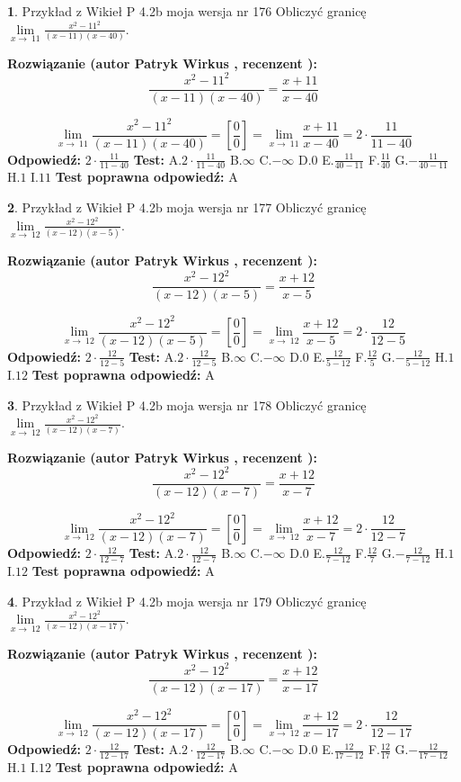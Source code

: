 \documentclass[12pt, a4paper]{article}
\theoremstyle{definition} %
\newtheorem{zad}{}
\newcommand{\zadStart}[1]{\begin{zad}#1\newline}
\newcommand{\zadStop}{\end{zad}}
\newcommand{\rozwStart}[2]{\noindent \textbf{Rozwiązanie (autor #1 , recenzent #2): }\newline}
\newcommand{\rozwStop}{\newline}
\newcommand{\odpStart}{\noindent \textbf{Odpowiedź:}\newline}
\newcommand{\odpStop}{\newline}
\newcommand{\testStart}{\noindent \textbf{Test:}\newline}
\newcommand{\testStop}{\newline}
\newcommand{\kluczStart}{\noindent \textbf{Test poprawna odpowiedź:}\newline}
\newcommand{\kluczStop}{\newline}
\begin{document}
\zadStart{Przykład z Wikieł P 4.2b moja wersja nr 176}
Obliczyć granicę $\lim\limits_{x\to\ 11}\frac{x^{2}-11^{2}}{(x-11)(x-40)}$.
\zadStop
\rozwStart{Patryk Wirkus}{}
$$\frac{x^{2}-11^{2}}{(x-11)(x-40)}=\frac{x+11}{x-40}$$

$$\lim\limits_{x\to\ 11}\frac{x^{2}-11^{2}}{(x-11)(x-40)}=[\frac{0}{0}]=\lim\limits_{x\to\ 11}\frac{x+11}{x-40}=2 \cdot \frac{11}{11-40}$$
\rozwStop
\odpStart
$2 \cdot \frac{11}{11-40}$
\odpStop
\testStart
A.$2 \cdot \frac{11}{11-40}$
B.$\infty$
C.$-\infty$
D.$0$
E.$\frac{11}{40-11}$
F.$\frac{11}{40}$
G.$-\frac{11}{40-11}$
H.$1$
I.$11$
\testStop
\kluczStart
A
\kluczStop



\zadStart{Przykład z Wikieł P 4.2b moja wersja nr 177}
Obliczyć granicę $\lim\limits_{x\to\ 12}\frac{x^{2}-12^{2}}{(x-12)(x-5)}$.
\zadStop
\rozwStart{Patryk Wirkus}{}
$$\frac{x^{2}-12^{2}}{(x-12)(x-5)}=\frac{x+12}{x-5}$$

$$\lim\limits_{x\to\ 12}\frac{x^{2}-12^{2}}{(x-12)(x-5)}=[\frac{0}{0}]=\lim\limits_{x\to\ 12}\frac{x+12}{x-5}=2 \cdot \frac{12}{12-5}$$
\rozwStop
\odpStart
$2 \cdot \frac{12}{12-5}$
\odpStop
\testStart
A.$2 \cdot \frac{12}{12-5}$
B.$\infty$
C.$-\infty$
D.$0$
E.$\frac{12}{5-12}$
F.$\frac{12}{5}$
G.$-\frac{12}{5-12}$
H.$1$
I.$12$
\testStop
\kluczStart
A
\kluczStop



\zadStart{Przykład z Wikieł P 4.2b moja wersja nr 178}
Obliczyć granicę $\lim\limits_{x\to\ 12}\frac{x^{2}-12^{2}}{(x-12)(x-7)}$.
\zadStop
\rozwStart{Patryk Wirkus}{}
$$\frac{x^{2}-12^{2}}{(x-12)(x-7)}=\frac{x+12}{x-7}$$

$$\lim\limits_{x\to\ 12}\frac{x^{2}-12^{2}}{(x-12)(x-7)}=[\frac{0}{0}]=\lim\limits_{x\to\ 12}\frac{x+12}{x-7}=2 \cdot \frac{12}{12-7}$$
\rozwStop
\odpStart
$2 \cdot \frac{12}{12-7}$
\odpStop
\testStart
A.$2 \cdot \frac{12}{12-7}$
B.$\infty$
C.$-\infty$
D.$0$
E.$\frac{12}{7-12}$
F.$\frac{12}{7}$
G.$-\frac{12}{7-12}$
H.$1$
I.$12$
\testStop
\kluczStart
A
\kluczStop



\zadStart{Przykład z Wikieł P 4.2b moja wersja nr 179}
Obliczyć granicę $\lim\limits_{x\to\ 12}\frac{x^{2}-12^{2}}{(x-12)(x-17)}$.
\zadStop
\rozwStart{Patryk Wirkus}{}
$$\frac{x^{2}-12^{2}}{(x-12)(x-17)}=\frac{x+12}{x-17}$$

$$\lim\limits_{x\to\ 12}\frac{x^{2}-12^{2}}{(x-12)(x-17)}=[\frac{0}{0}]=\lim\limits_{x\to\ 12}\frac{x+12}{x-17}=2 \cdot \frac{12}{12-17}$$
\rozwStop
\odpStart
$2 \cdot \frac{12}{12-17}$
\odpStop
\testStart
A.$2 \cdot \frac{12}{12-17}$
B.$\infty$
C.$-\infty$
D.$0$
E.$\frac{12}{17-12}$
F.$\frac{12}{17}$
G.$-\frac{12}{17-12}$
H.$1$
I.$12$
\testStop
\kluczStart
A
\kluczStop
\end{document}
